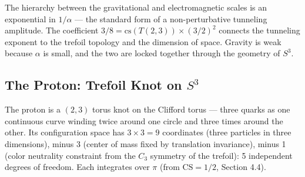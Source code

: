 \begin{center}
\end{center}

\medskip
The hierarchy between the gravitational and electromagnetic scales is an exponential in $1/\alpha$ --- the standard form of a non-perturbative tunneling amplitude. The coefficient $3/8 = \mathrm{cs}(T(2,3)) \times (3/2)^2$ connects the tunneling exponent to the trefoil topology and the dimension of space. Gravity is weak because $\alpha$ is small, and the two are locked together through the geometry of $S^3$.



\subsection{The Proton: Trefoil Knot on $S^3$}

The proton is a $(2,3)$ torus knot on the Clifford torus --- three quarks as one continuous curve winding twice around one circle and three times around the other. Its configuration space has $3 \times 3 = 9$ coordinates (three particles in three dimensions), minus 3 (center of mass fixed by translation invariance), minus 1 (color neutrality constraint from the $C_3$ symmetry of the trefoil): 5 independent degrees of freedom. Each integrates over $\pi$ (from $\mathrm{CS} = 1/2$, Section 4.4).

